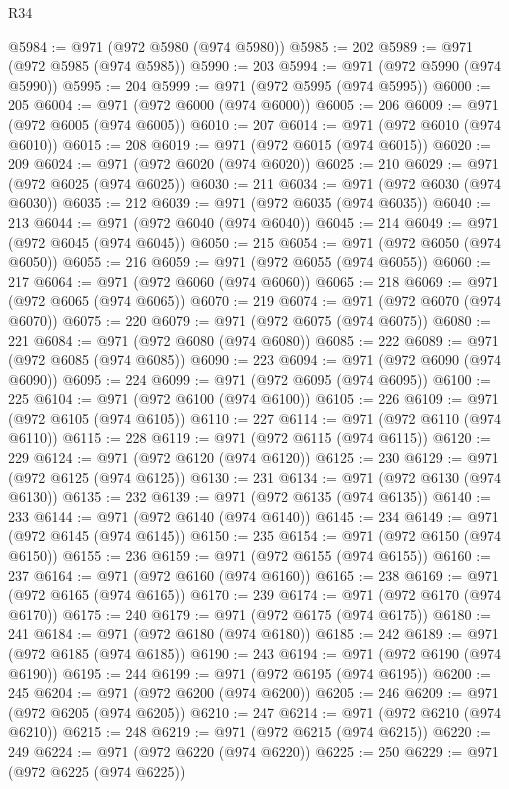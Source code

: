\begin{lexlean}{R34}
\begin{coremodule}
@5984 := @971 (@972 @5980 (@974 @5980))
@5985 := 202
@5989 := @971 (@972 @5985 (@974 @5985))
@5990 := 203
@5994 := @971 (@972 @5990 (@974 @5990))
@5995 := 204
@5999 := @971 (@972 @5995 (@974 @5995))
@6000 := 205
@6004 := @971 (@972 @6000 (@974 @6000))
@6005 := 206
@6009 := @971 (@972 @6005 (@974 @6005))
@6010 := 207
@6014 := @971 (@972 @6010 (@974 @6010))
@6015 := 208
@6019 := @971 (@972 @6015 (@974 @6015))
@6020 := 209
@6024 := @971 (@972 @6020 (@974 @6020))
@6025 := 210
@6029 := @971 (@972 @6025 (@974 @6025))
@6030 := 211
@6034 := @971 (@972 @6030 (@974 @6030))
@6035 := 212
@6039 := @971 (@972 @6035 (@974 @6035))
@6040 := 213
@6044 := @971 (@972 @6040 (@974 @6040))
@6045 := 214
@6049 := @971 (@972 @6045 (@974 @6045))
@6050 := 215
@6054 := @971 (@972 @6050 (@974 @6050))
@6055 := 216
@6059 := @971 (@972 @6055 (@974 @6055))
@6060 := 217
@6064 := @971 (@972 @6060 (@974 @6060))
@6065 := 218
@6069 := @971 (@972 @6065 (@974 @6065))
@6070 := 219
@6074 := @971 (@972 @6070 (@974 @6070))
@6075 := 220
@6079 := @971 (@972 @6075 (@974 @6075))
@6080 := 221
@6084 := @971 (@972 @6080 (@974 @6080))
@6085 := 222
@6089 := @971 (@972 @6085 (@974 @6085))
@6090 := 223
@6094 := @971 (@972 @6090 (@974 @6090))
@6095 := 224
@6099 := @971 (@972 @6095 (@974 @6095))
@6100 := 225
@6104 := @971 (@972 @6100 (@974 @6100))
@6105 := 226
@6109 := @971 (@972 @6105 (@974 @6105))
@6110 := 227
@6114 := @971 (@972 @6110 (@974 @6110))
@6115 := 228
@6119 := @971 (@972 @6115 (@974 @6115))
@6120 := 229
@6124 := @971 (@972 @6120 (@974 @6120))
@6125 := 230
@6129 := @971 (@972 @6125 (@974 @6125))
@6130 := 231
@6134 := @971 (@972 @6130 (@974 @6130))
@6135 := 232
@6139 := @971 (@972 @6135 (@974 @6135))
@6140 := 233
@6144 := @971 (@972 @6140 (@974 @6140))
@6145 := 234
@6149 := @971 (@972 @6145 (@974 @6145))
@6150 := 235
@6154 := @971 (@972 @6150 (@974 @6150))
@6155 := 236
@6159 := @971 (@972 @6155 (@974 @6155))
@6160 := 237
@6164 := @971 (@972 @6160 (@974 @6160))
@6165 := 238
@6169 := @971 (@972 @6165 (@974 @6165))
@6170 := 239
@6174 := @971 (@972 @6170 (@974 @6170))
@6175 := 240
@6179 := @971 (@972 @6175 (@974 @6175))
@6180 := 241
@6184 := @971 (@972 @6180 (@974 @6180))
@6185 := 242
@6189 := @971 (@972 @6185 (@974 @6185))
@6190 := 243
@6194 := @971 (@972 @6190 (@974 @6190))
@6195 := 244
@6199 := @971 (@972 @6195 (@974 @6195))
@6200 := 245
@6204 := @971 (@972 @6200 (@974 @6200))
@6205 := 246
@6209 := @971 (@972 @6205 (@974 @6205))
@6210 := 247
@6214 := @971 (@972 @6210 (@974 @6210))
@6215 := 248
@6219 := @971 (@972 @6215 (@974 @6215))
@6220 := 249
@6224 := @971 (@972 @6220 (@974 @6220))
@6225 := 250
@6229 := @971 (@972 @6225 (@974 @6225))

\end{coremodule}
\end{lexlean}
